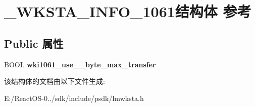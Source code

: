 \hypertarget{struct___w_k_s_t_a___i_n_f_o__1061}{}\section{\+\_\+\+W\+K\+S\+T\+A\+\_\+\+I\+N\+F\+O\+\_\+1061结构体 参考}
\label{struct___w_k_s_t_a___i_n_f_o__1061}
\subsection*{Public 属性}
\begin{DoxyCompactItemize}
\item 
\mbox{\label{struct___w_k_s_t_a___i_n_f_o__1061_ae967d49ee5afa12c6ab33a5f1bb8626e}} 
B\+O\+OL {\bfseries wki1061\+\_\+use\+\_\+\_\+byte\+\_\+max\+\_\+transfer}
\end{DoxyCompactItemize}


该结构体的文档由以下文件生成\+:\begin{DoxyCompactItemize}
\item 
E\+:/\+React\+O\+S-\/0../sdk/include/psdk/lmwksta.\+h\end{DoxyCompactItemize}
